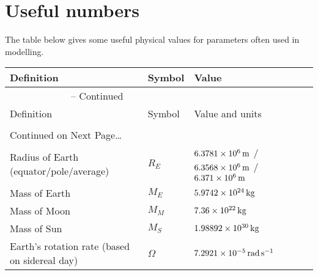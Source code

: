 \chapter{Useful numbers}

The table below gives some useful physical values for parameters often used in modelling.

\begin{center}
\begin{longtable}{lll}
\hline\hline
Definition & Symbol & Value\\
\hline\hline
\endfirsthead
%
\multicolumn{2}{c}{{\tablename} -- Continued} \\[0.5ex]
\hline\hline
Definition & Symbol & Value and units\\
\hline\hline
\endhead
  \\[0.5ex]
  \multicolumn{2}{l}{{Continued on Next Page\ldots}} \\
\endfoot
  \hline
\endlastfoot
%
Radius of Earth (equator/pole/average)          &  $R_E$        &  $\m[6.3781\times 10^6]$ / $\m[6.3568\times 10^6]$ / $\m[6.371\times 10^6]$\\
Mass of Earth                                   &  $M_E$        &  $\kg[5.9742\times 10^{24}]$\\
Mass of Moon                                    &  $M_M$        &  $\kg[7.36\times 10^{22}]$\\
Mass of Sun                                     &  $M_S$        &  $\kg[1.98892\times 10^{30}]$\\
Earth's rotation rate (based on sidereal day)   &  $\Omega$     &  $\rads[7.2921\times 10^{-5}]$\\
\end{longtable}
\end{center}
